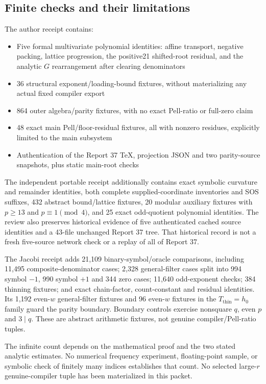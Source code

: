 \documentclass[11pt,letterpaper]{article}
\theoremstyle{definition}\newtheorem{definition}[theorem]{Definition}
\theoremstyle{remark}\newtheorem{remark}[theorem]{Remark}
\begin{document}
\subsection{Finite checks and their limitations}
The author receipt contains:\nopagebreak[4]
\begin{itemize}
\item Five formal multivariate polynomial identities: affine transport, negative packing, lattice progression, the positive21 shifted-root residual, and the analytic $G$ rearrangement after clearing denominators
\item 36 structural exponent/loading-bound fixtures, without materializing any actual fixed compiler export
\item 864 outer algebra/parity fixtures, with no exact Pell-ratio or full-zero claim
\item 48 exact main Pell/floor-residual fixtures, all with nonzero residues, explicitly limited to the main subsystem
\item Authentication of the Report 37 TeX, projection JSON and two parity-source snapshots, plus static main-root checks
\end{itemize}
The independent portable receipt additionally contains exact symbolic curvature and remainder identities, both complete supplied-coordinate inventories and SOS suffixes, 432 abstract bound/lattice fixtures, 20 modular auxiliary fixtures with $p\ge13$ and $p\equiv1\pmod4$, and 25 exact odd-quotient polynomial identities. The review also preserves historical evidence of five authenticated cached source identities and a 43-file unchanged Report 37 tree. That historical record is not a fresh five-source network check or a replay of all of Report 37.

The Jacobi receipt adds 21,109 binary-symbol/oracle comparisons, including 11,495 composite-denominator cases; 2,328 general-filter cases split into 994 symbol $-1$, 990 symbol $+1$ and 344 zero cases; 11,640 odd-exponent checks; 384 thinning fixtures; and exact chain-factor, count-constant and residual identities. Its 1,192 even-$w$ general-filter fixtures and 96 even-$w$ fixtures in the $T_{\mathrm{thin}}=h_0$ family guard the parity boundary. Boundary controls exercise nonsquare $q$, even $p$ and $3\mid q$. These are abstract arithmetic fixtures, not genuine compiler/Pell-ratio tuples.

The infinite count depends on the mathematical proof and the two stated analytic estimates. No numerical frequency experiment, floating-point sample, or symbolic check of finitely many indices establishes that count. No selected large-$r$ genuine-compiler tuple has been materialized in this packet.
\end{document}
